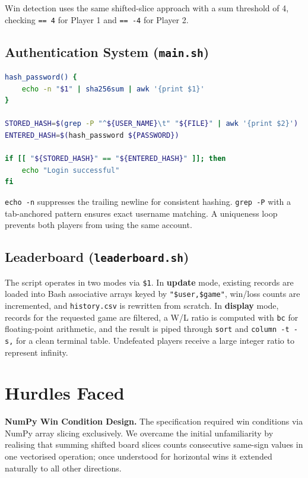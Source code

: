 \documentclass[12pt,a4paper]{article}
\begin{document}
Win detection uses the same shifted-slice approach with a sum threshold of 4, checking \texttt{== 4} for Player 1 and \texttt{== -4} for Player 2.

\subsection{Authentication System (\texttt{main.sh})}

\begin{lstlisting}[language=bash, caption={SHA-256 password hashing and verification}]
hash_password() {
    echo -n "$1" | sha256sum | awk '{print $1}'
}

STORED_HASH=$(grep -P "^${USER_NAME}\t" "${FILE}" | awk '{print $2}')
ENTERED_HASH=$(hash_password ${PASSWORD})

if [[ "${STORED_HASH}" == "${ENTERED_HASH}" ]]; then
    echo "Login successful"
fi
\end{lstlisting}

\texttt{echo -n} suppresses the trailing newline for consistent hashing. \texttt{grep -P} with a tab-anchored pattern ensures exact username matching. A uniqueness loop prevents both players from using the same account.

\subsection{Leaderboard (\texttt{leaderboard.sh})}

The script operates in two modes via \texttt{\$1}. In \textbf{update} mode, existing records are loaded into Bash associative arrays keyed by \texttt{"\$user,\$game"}, win/loss counts are incremented, and \texttt{history.csv} is rewritten from scratch. In \textbf{display} mode, records for the requested game are filtered, a W/L ratio is computed with \texttt{bc} for floating-point arithmetic, and the result is piped through \texttt{sort} and \texttt{column -t -s,} for a clean terminal table. Undefeated players receive a large integer ratio to represent infinity.

\newpage

\section{Hurdles Faced}

\textbf{NumPy Win Condition Design.} The specification required win conditions via NumPy array slicing exclusively. We overcame the initial unfamiliarity by realising that summing shifted board slices counts consecutive same-sign values in one vectorised operation; once understood for horizontal wins it extended naturally to all other directions.
\end{document}
